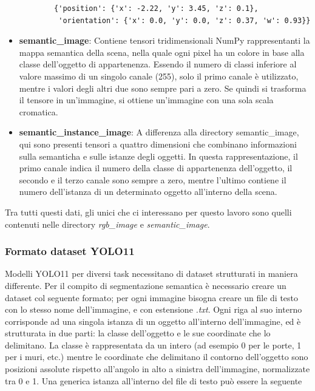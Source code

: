 \documentclass[12pt]{report}
\begin{document}
\begin{itemize}
	\begin{verbatim}
		{'position': {'x': -2.22, 'y': 3.45, 'z': 0.1},
		 'orientation': {'x': 0.0, 'y': 0.0, 'z': 0.37, 'w': 0.93}}
	\end{verbatim}
	
	\item \textbf{semantic\_image}: Contiene tensori tridimensionali NumPy rappresentanti la mappa semantica della scena, nella quale ogni pixel ha un colore in base alla classe dell'oggetto di appartenenza. Essendo il numero di classi inferiore al valore massimo di un singolo canale (255), solo il primo canale è utilizzato, mentre i valori degli altri due sono sempre pari a zero. Se quindi si trasforma il tensore in un'immagine, si ottiene un'immagine con una sola scala cromatica.
	
	\item \textbf{semantic\_instance\_image}: A differenza alla directory semantic\_image, qui sono presenti tensori a quattro dimensioni che combinano informazioni sulla semanticha e sulle istanze degli oggetti. In questa rappresentazione, il primo canale indica il numero della classe di appartenenza dell'oggetto, il secondo e il terzo canale sono sempre a zero, mentre l'ultimo contiene il numero dell'istanza di un determinato oggetto all'interno della scena.
\end{itemize}

Tra tutti questi dati, gli unici che ci interessano per questo lavoro sono quelli contenuti nelle directory \textit{rgb\_image} e \textit{semantic\_image}.

\subsubsection{Formato dataset YOLO11}
\label{sec:formato_dataset_yolo11}

Modelli YOLO11 per diversi task necessitano di dataset strutturati in maniera differente. Per il compito di segmentazione semantica è necessario creare un dataset col seguente formato; per ogni immagine bisogna creare un file di testo con lo stesso nome dell'immagine, e con estensione \textit{.txt}. Ogni riga al suo interno corrisponde ad una singola istanza di un oggetto all'interno dell'immagine, ed è strutturata in due parti: la classe dell'oggetto e le sue coordinate che lo delimitano. La classe è rappresentata da un intero (ad esempio 0 per le porte, 1 per i muri, etc.) mentre le coordinate che delimitano il contorno dell'oggetto sono posizioni assolute rispetto all'angolo in alto a sinistra dell'immagine, normalizzate tra 0 e 1. Una generica istanza all'interno del file di testo può essere la seguente
\end{document}
